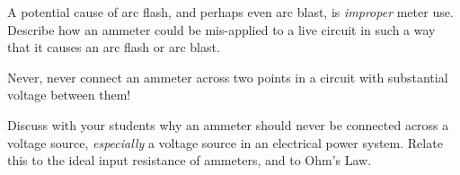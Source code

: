 

A potential cause of arc flash, and perhaps even arc blast, is {\it improper} meter use.  Describe how an ammeter could be mis-applied to a live circuit in such a way that it causes an arc flash or arc blast.







Never, never connect an ammeter across two points in a circuit with substantial voltage between them!







Discuss with your students why an ammeter should never be connected across a voltage source, {\it especially} a voltage source in an electrical power system.  Relate this to the ideal input resistance of ammeters, and to Ohm's Law.





